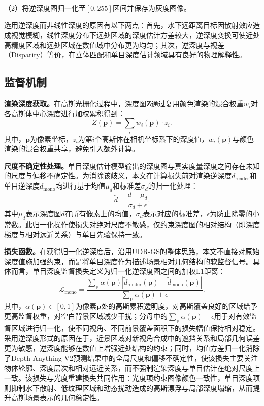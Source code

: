 （2）将逆深度图归一化至$[0,255]$区间并保存为灰度图像。

选用逆深度而非线性深度的原因有以下两点：首先，水下远距离目标因散射效应造成视觉模糊，线性深度分布下远处区域的深度估计方差较大，逆深度变换可使近处高精度区域和远处区域在数值域中分布更为均匀；其次，逆深度与视差（Disparity）等价，在立体匹配和单目深度估计领域具有良好的物理解释性。

\subsection{监督机制}

\textbf{渲染深度获取。}在高斯光栅化过程中，深度图$\mathbf{Z}$通过复用颜色渲染的混合权重$w_i$对各高斯体中心深度进行加权累积得到：
\begin{equation}
  Z(\mathbf{p}) = \sum_{i} w_i(\mathbf{p}) \cdot z_i.
  \label{eq:renderdepth}
\end{equation}
其中，$\mathbf{p}$为像素坐标，$z_i$为第$i$个高斯体在相机坐标系下的深度值，$w_i(\mathbf{p})$与颜色渲染的混合权重共享，避免引入额外计算。

\textbf{尺度不确定性处理。}单目深度估计模型输出的深度图与真实度量深度之间存在未知的尺度与偏移不确定性。为消除该歧义，本文在计算损失前对渲染逆深度$d_{\mathrm{render}}$和单目逆深度$d_{\mathrm{mono}}$均进行基于均值$\mu_d$和标准差$\sigma_d$的归一化处理：
\begin{equation}
  \tilde{d} = \frac{d - \mu_d}{\sigma_d + \epsilon}.
  \label{eq:depthnorm2}
\end{equation}其中$\mu_d$表示深度图$d$在所有像素上的均值，$\sigma_d$表示对应的标准差，$\epsilon$为防止除零的小常数。此归一化操作使损失对绝对尺度不敏感，仅约束深度图的相对结构（即深度梯度与相对远近关系）与单目先验保持一致。

\textbf{损失函数。}在获得归一化逆深度后，沿用UDR-GS的整体思路，本文不直接对原始深度值施加强约束，而是将单目深度作为描述场景相对几何结构的软监督信号。具体而言，单目深度监督损失定义为归一化逆深度图之间的加权L1距离：
\begin{equation}
  \mathcal{L}_{\mathrm{mono}} =
  \frac{\sum_{\mathbf{p}} \alpha(\mathbf{p})
  \left|\tilde{d}_{\mathrm{render}}(\mathbf{p}) - \tilde{d}_{\mathrm{mono}}(\mathbf{p})\right|}
  {\sum_{\mathbf{p}} \alpha(\mathbf{p}) + \epsilon}.
  \label{eq:depthloss}
\end{equation}其中，$\alpha(\mathbf{p}) \in [0,1]$为像素$\mathbf{p}$处的高斯累积透明度，对高斯覆盖良好的区域给予更高监督权重，对空白背景区域减少干扰；分母中的$\sum_{\mathbf{p}}\alpha(\mathbf{p})+\epsilon$用于对有效监督区域进行归一化，使不同视角、不同前景覆盖面积下的损失幅值保持相对稳定。采用逆深度形式的原因在于，近景区域对新视角合成中的遮挡关系和局部几何误差更为敏感，逆深度能够在数值上增强近处结构的约束；同时，均值方差归一化消除了Depth Anything V2预测结果中的全局尺度和偏移不确定性，使该损失主要关注物体轮廓、深度层次和相对远近关系，而不强制渲染深度与单目估计在绝对尺度上一致。该损失与光度重建损失共同作用：光度项约束图像颜色一致性，单目深度项则抑制水下散射、低纹理区域和动态扰动造成的高斯漂浮与局部深度塌缩，从而提升高斯场景表示的几何稳定性。

